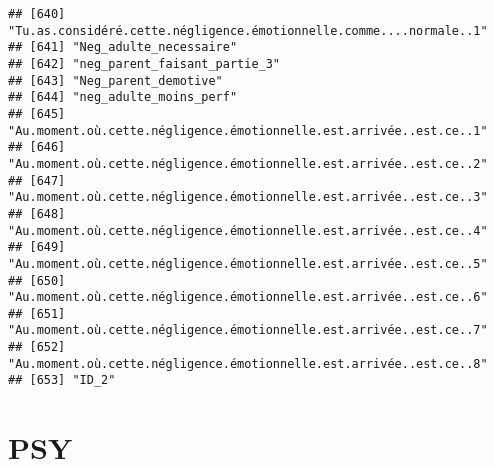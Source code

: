 \documentclass[
]{article}
\begin{document}
\begin{verbatim}
## [640] "Tu.as.considéré.cette.négligence.émotionnelle.comme....normale..1" 
## [641] "Neg_adulte_necessaire"                                             
## [642] "neg_parent_faisant_partie_3"                                       
## [643] "Neg_parent_demotive"                                               
## [644] "neg_adulte_moins_perf"                                             
## [645] "Au.moment.où.cette.négligence.émotionnelle.est.arrivée..est.ce..1" 
## [646] "Au.moment.où.cette.négligence.émotionnelle.est.arrivée..est.ce..2" 
## [647] "Au.moment.où.cette.négligence.émotionnelle.est.arrivée..est.ce..3" 
## [648] "Au.moment.où.cette.négligence.émotionnelle.est.arrivée..est.ce..4" 
## [649] "Au.moment.où.cette.négligence.émotionnelle.est.arrivée..est.ce..5" 
## [650] "Au.moment.où.cette.négligence.émotionnelle.est.arrivée..est.ce..6" 
## [651] "Au.moment.où.cette.négligence.émotionnelle.est.arrivée..est.ce..7" 
## [652] "Au.moment.où.cette.négligence.émotionnelle.est.arrivée..est.ce..8" 
## [653] "ID_2"
\end{verbatim}

\hypertarget{psy}{%
\section{PSY}\label{psy}}
\end{document}
